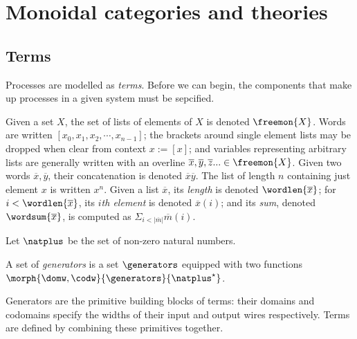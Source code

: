 \chapter{Monoidal categories and theories}

\section{Terms}

Processes are modelled as \emph{terms}.
Before we can begin, the components that make up processes in a given system
must be sepcified.

\begin{notation}
    Given a set \(X\), the set of lists of elements of \(X\) is denoted
    \(\freemon{X}\).
    Words are written \([x_0, x_1, x_2, \cdots, x_{n-1}]\); the brackets around
    single element lists may be dropped when clear from context \(x := [x]\);
    and variables representing arbitrary lists are generally written with an
    overline \(
        \overline{x}, \overline{y}, \overline{z}... \in \freemon{X}
    \).
    Given two words \(\overline{x}, \overline{y}\), their concatenation is
    denoted \(\overline{x}\overline{y}\).
    The list of length \(n\) containing just element \(x\) is written \(x^n\).
    Given a list \(\overline{x}\), its \emph{length} is denoted
    \(\wordlen{\overline{x}}\); for \(i < \wordlen{\overline{x}}\), its
    \(i\)\emph{th element} is denoted \(\overline{x}(i)\); and its
    \emph{sum}, denoted \(\wordsum{\overline{x}}\), is computed as
    \(\Sigma_{i < |\overline{m}|}\overline{m}(i)\).
\end{notation}

\begin{notation}
    Let \(\natplus\) be the set of non-zero natural numbers.
\end{notation}

\begin{definition}[Generators]
    A set of \emph{generators} is a set \(\generators\) equipped with two
    functions \(\morph{\domw,\codw}{\generators}{\natplus^\star}\).
\end{definition}

Generators are the primitive building blocks of terms: their domains and
codomains specify the widths of their input and output wires respectively.
Terms are defined by combining these primitives together.

